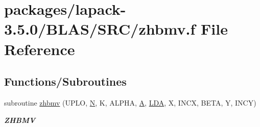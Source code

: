\hypertarget{lapack-3_85_80_2BLAS_2SRC_2zhbmv_8f}{}\section{packages/lapack-\/3.5.0/\+B\+L\+A\+S/\+S\+R\+C/zhbmv.f File Reference}
\label{lapack-3_85_80_2BLAS_2SRC_2zhbmv_8f}
\subsection*{Functions/\+Subroutines}
\begin{DoxyCompactItemize}
\item 
subroutine \hyperlink{group__complex16__blas__level2_ga6f0283c18c02df85b4d4ad5e9f37c61d}{zhbmv} (U\+P\+L\+O, \hyperlink{polmisc_8c_a0240ac851181b84ac374872dc5434ee4}{N}, K, A\+L\+P\+H\+A, \hyperlink{classA}{A}, \hyperlink{example__user_8c_ae946da542ce0db94dced19b2ecefd1aa}{L\+D\+A}, X, I\+N\+C\+X, B\+E\+T\+A, Y, I\+N\+C\+Y)
\begin{DoxyCompactList}\small\item\em {\bfseries Z\+H\+B\+M\+V} \end{DoxyCompactList}\end{DoxyCompactItemize}
